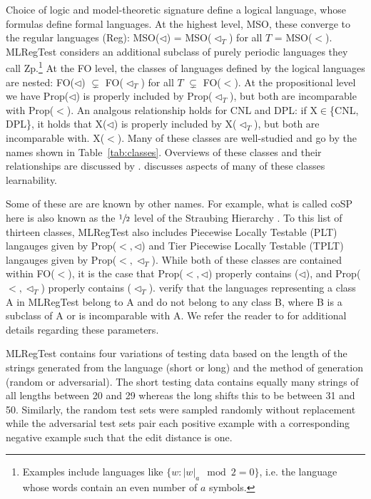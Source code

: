 \documentclass[twoside,11pt]{article}
\begin{document}
Choice of logic and model-theoretic signature define a logical language, whose formulas define formal languages.
At the highest level, MSO, these converge to the regular languages (Reg): MSO($\triangleleft$) = MSO($\triangleleft_T$) for all $T$ = MSO($<$).
MLRegTest considers an additional subclass of purely periodic languages they call Zp.\footnote{Examples include languages like $\{ w : |w|_a \mod 2 = 0\}$, i.e. the language whose words contain an even number of $a$ symbols.}
  At the FO level, the classes of languages defined by the logical languages are nested: FO($\triangleleft$) $\subsetneq$ FO($\triangleleft_T$) for all $T$ $\subsetneq$ FO($<$).
  At the propositional level we have Prop($\triangleleft$) is properly included by Prop($\triangleleft_T$), but both are incomparable with Prop($<$).
  An analgous relationship holds for CNL and DPL: if X$\in$\{CNL, DPL\}, it holds that X($\triangleleft$) is properly included by X($\triangleleft_T$), but both are incomparable with. X($<$).
  Many of these classes are well-studied and go by the names shown in Table~\ref{tab:classes}. Overviews of these classes and their relationships are discussed by \citet{McNaughtonPapert1971, Thomas1982, Thomas1997, RogersPullum2011, Rogers-HeinzEtAl-2013-CSC, rogers-lambert-2019-classes}. \citet{Lambert+2021-TESRL} discusses aspects of many of these classes learnability.

  Some of these are are known by other names. For example, what is called coSP here is also known as the $\sfrac{1}{2}$ level of the Straubing Hierarchy \citep{Straubing1985,PinWeil1997}.
  To this list of thirteen classes, MLRegTest also includes Piecewise Locally Testable (PLT) langauges given by Prop($<,\triangleleft$) and Tier Piecewise Locally Testable (TPLT) langauges given by Prop($<,\triangleleft_T$).
  While both of these classes are contained within FO($<$), it is the case that Prop($<,\triangleleft$) properly contains ($\triangleleft$), and Prop($<,\triangleleft_T$) properly contains ($\triangleleft_T$).
  \citet{heinz-etal-2022-mlregtest} verify that the languages representing a class A in MLRegTest belong to A and do not belong to any class B, where B is a subclass of A or is incomparable with A.
  We refer the reader to \citet{heinz-etal-2022-mlregtest} for additional details regarding these parameters.

MLRegTest contains four variations of testing data based on the length of the strings generated from the language (short or long) and the method of generation (random or adversarial). The short testing data contains equally many strings of all lengths between 20 and 29 whereas the long shifts this to be between 31 and 50. Similarly, the random test sets were sampled randomly without replacement while the adversarial test sets pair each positive example with a corresponding negative example such that the edit distance is one.
\end{document}
